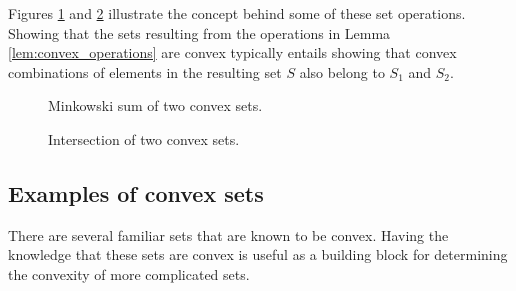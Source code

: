 Figures \ref{fig:mink_sum} and \ref{fig:intersection} illustrate the concept behind some of these set operations. Showing that the sets resulting from the operations in Lemma \ref{lem:convex_operations} are convex typically entails showing that convex combinations of elements in the resulting set $S$ also belong to $S_1$ and $S_2$.

\begin{figure}
	\centering
		\caption{Minkowski sum of two convex sets.}\label{fig:mink_sum}
\end{figure}

%
\begin{figure}
	\centering
    
    \caption{Intersection of two convex sets.} \label{fig:intersection}
\end{figure}
%

\subsection{Examples of convex sets}

There are several familiar sets that are known to be convex. Having the knowledge that these sets are convex is useful as a building block for determining the convexity of more complicated sets.

